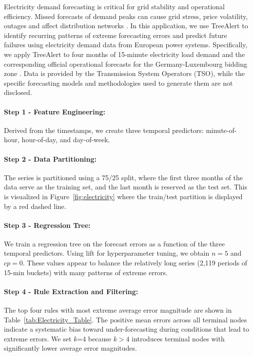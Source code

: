 \documentclass[]{interact}
\theoremstyle{plain}
\theoremstyle{definition}
\theoremstyle{remark}
\begin{document}
Electricity demand forecasting is critical for grid stability and operational efficiency.
Missed forecasts of demand peaks can cause grid stress, price volatility, outages and affect
distribution networks \citep{ciarreta2023, gilbert2023, steinbuks2019}. In this application,
we use TreeAlert to identify recurring patterns of extreme forecasting errors and predict
future failures using electricity demand data from European power systems. Specifically, we
apply TreeAlert to four months of 15-minute electricity load demand and the corresponding
official operational forecasts for the Germany-Luxembourg bidding zone
\citep{entsoe2025}. Data is provided by the Transmission System Operators (TSO), while the
specific forecasting models and methodologies used to generate them are not disclosed.

\paragraph{Step 1 - Feature Engineering:}
Derived from the timestamps, we create three temporal predictors: minute-of-hour,
hour-of-day, and day-of-week.

\paragraph{Step 2 - Data Partitioning:}
The series is partitioned using a 75/25 split, where the first three months of the data
serve as the training set, and the last month is reserved as the test set. This is visualized
in Figure~\ref{fig:electricity} where the train/test partition is displayed by a red dashed
line.

\paragraph{Step 3 - Regression Tree:}
We train a regression tree on the forecast errors as a function of the three temporal
predictors. Using lift for hyperparameter tuning, we obtain $n = 5$ and $cp = 0$. These
values appear to balance the relatively long series (2,119 periods of 15-min buckets) with
many patterns of extreme errors.

\paragraph{Step 4 - Rule Extraction and Filtering:}
\label{sec:rule_filtering}
The top four rules with most extreme average error magnitude are shown in
Table~\ref{tab:Electricity_Table}. The positive mean errors across all terminal nodes indicate
a systematic bias toward under-forecasting during conditions that lead to extreme errors. We
set $k$=4 because $k>4$ introduces terminal nodes with significantly lower average error
magnitudes.
\end{document}
